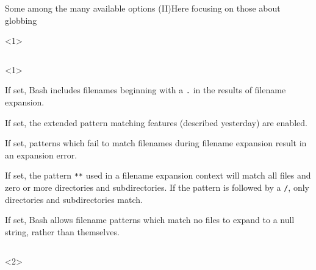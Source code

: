 \begin{frame}[fragile]{Some among the many available options (II)}{Here focusing on those about globbing}
    \begin{onlyenv}<1>
        \vspace{-4mm}
        \begin{columns}
            \begin{column}{\dimexpr\paperwidth-10mm}
                \begin{onlyenv}<1>
                    \begin{description}
                        \setlength{\itemsep}{3mm}
                        \item[\PB{\texttt{dotglob}}]
                            If set, Bash includes filenames beginning with a \texttt{.} in the results of filename expansion.\\[-1mm]
                        \item[\PB{\texttt{extglob}}]
                            If set, the extended pattern matching features (described yesterday) are enabled.
                        \item[\PB{\texttt{failglob}}]
                            If set, patterns which fail to match filenames during filename expansion result in an expansion error.
                        \item[\PB{\texttt{globstar}}]
                            If set, the pattern \texttt{**} used in a filename expansion context will match all files and zero or more directories and subdirectories.
                            If the pattern is followed by a \texttt{/}, only directories and subdirectories match. 
                        \item[\PB{\texttt{nullglob}}]
                            If set, Bash allows filename patterns which match no files to expand to a null string, rather than themselves.
                    \end{description}
                \end{onlyenv}
            \end{column}
        \end{columns}
    \end{onlyenv}
    \begin{onlyenv}<2>
        \begin{lstlisting}[style=myBash]

\end{lstlisting}
\end{onlyenv}
\end{frame}
